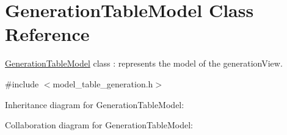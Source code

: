 \hypertarget{class_generation_table_model}{}\section{Generation\+Table\+Model Class Reference}
\label{class_generation_table_model}


\hyperlink{class_generation_table_model}{Generation\+Table\+Model} class \+: represents the model of the generation\+View.  




{\ttfamily \#include $<$model\+\_\+table\+\_\+generation.\+h$>$}



Inheritance diagram for Generation\+Table\+Model\+:


Collaboration diagram for Generation\+Table\+Model\+:
